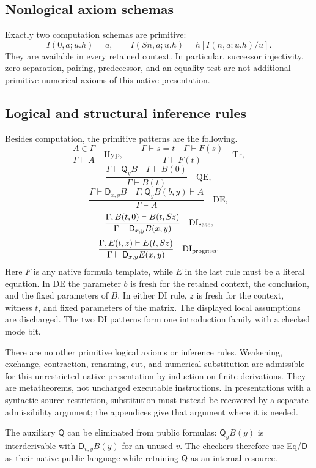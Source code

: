 \documentclass[11pt,letterpaper]{article}
\theoremstyle{definition}
\newcommand{\D}{\mathsf D}
\newcommand{\Q}{\mathsf Q}
\begin{document}
\subsection{Nonlogical axiom schemas}

Exactly two computation schemas are primitive:
\[
 I(0,a;u.h)=a,\qquad
 I(Sn,a;u.h)=h[I(n,a;u.h)/u].
\tag{I0,IS}
\]
They are available in every retained context. In particular, successor
injectivity, zero separation, pairing, predecessor, and an equality test
are not additional primitive numerical axioms of this native presentation.

\subsection{Logical and structural inference rules}

Besides computation, the primitive patterns are the following.
\[
 \frac{A\in\Gamma}{\Gamma\vdash A}\quad\mathrm{Hyp},\qquad
 \frac{\Gamma\vdash s=t\quad\Gamma\vdash F(s)}
      {\Gamma\vdash F(t)}\quad\mathrm{Tr},
\]
\[
 \frac{\Gamma\vdash\Q_yB\quad\Gamma\vdash B(0)}
      {\Gamma\vdash B(t)}\quad\mathrm{QE},
\]
\[
 \frac{\Gamma\vdash\D_{x,y}B\quad
       \Gamma,\Q_yB(b,y)\vdash A}
      {\Gamma\vdash A}\quad\mathrm{DE},
\]
\[
 \frac{\Gamma,B(t,0)\vdash B(t,Sz)}
      {\Gamma\vdash\D_{x,y}B(x,y)}\quad\mathrm{DI}_{\rm case},
\]
\[
 \frac{\Gamma,E(t,z)\vdash E(t,Sz)}
      {\Gamma\vdash\D_{x,y}E(x,y)}\quad\mathrm{DI}_{\rm progress}.
\]
Here $F$ is any native formula template, while $E$ in the last rule must
be a literal equation. In DE the parameter $b$ is fresh for the retained
context, the conclusion, and the fixed parameters of $B$. In either DI
rule, $z$ is fresh for the context, witness $t$, and fixed parameters of the
matrix. The displayed local assumptions are discharged. The two DI
patterns form one introduction family with a checked mode bit.

There are no other primitive logical axioms or inference rules. Weakening,
exchange, contraction, renaming, cut, and numerical substitution are
admissible for this unrestricted native presentation by induction on
finite derivations. They are metatheorems, not uncharged executable
instructions. In presentations with a syntactic source restriction,
substitution must instead be recovered by a separate admissibility
argument; the appendices give that argument where it is needed.

The auxiliary $\Q$ can be eliminated from public formulas: $\Q_yB(y)$ is
interderivable with $\D_{v,y}B(y)$ for an unused $v$. The checkers therefore
use Eq/$\D$ as their native public language while retaining $\Q$ as an
internal resource.
\end{document}
